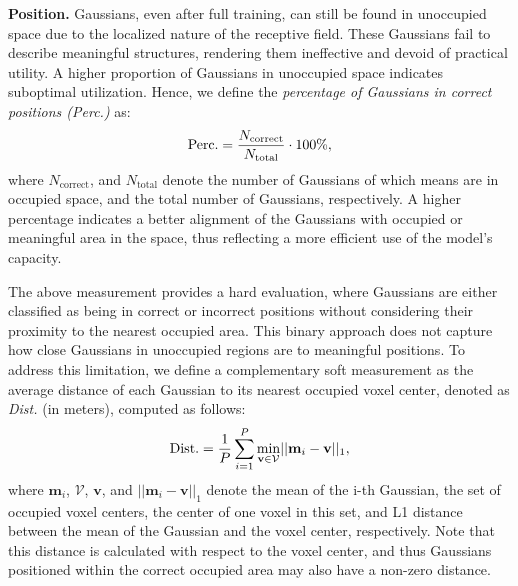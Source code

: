 \textbf{Position.} 
Gaussians, even after full training, can still be found in unoccupied space due to the localized nature of the receptive field. 
These Gaussians fail to describe meaningful structures, rendering them ineffective and devoid of practical utility. 
A higher proportion of Gaussians in unoccupied space indicates suboptimal utilization. 
Hence, we define the \textit{percentage of Gaussians in correct positions (Perc.)} as:
\begin{equation}
    {\rm Perc.} = \frac{N_{\text{correct}}}{N_{\text{total}}} \cdot 100\%,
    \label{eq: Perc.}
\end{equation}
where $N_{\text{correct}}$, and $N_{\text{total}}$ denote the number of Gaussians of which means are in occupied space, and the total number of Gaussians, respectively. 
A higher percentage indicates a better alignment of the Gaussians with occupied or meaningful area in the space, thus reflecting a more efficient use of the model's capacity.

The above measurement provides a hard evaluation, where Gaussians are either classified as being in correct or incorrect positions without considering their proximity to the nearest occupied area. 
This binary approach does not capture how close Gaussians in unoccupied regions are to meaningful positions. 
To address this limitation, we define a complementary soft measurement as the average distance of each Gaussian to its nearest occupied voxel center, denoted as \textit{Dist.} (in meters), computed as follows:
\begin{equation}
    {\rm Dist.} = \frac{1}{P} \sum_{i=1}^{P} \underset{\mathbf{v} \in \mathcal{V}}{\rm min} ||\mathbf{m}_i - \mathbf{v}||_1,
    \label{eq: Dist.}
\end{equation}
where $\mathbf{m}_i$, $\mathcal{V}$, $\mathbf{v}$, and $||\mathbf{m}_i - \mathbf{v}||_1$ denote the mean of the i-th Gaussian, the set of occupied voxel centers, the center of one voxel in this set, and L1 distance between the mean of the Gaussian and the voxel center, respectively.
Note that this distance is calculated with respect to the voxel center, and thus Gaussians positioned within the correct occupied area may also have a non-zero distance.


